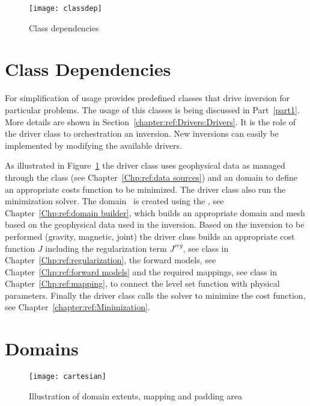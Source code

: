 \begin{figure}[ht]
    \centering\texttt{[image: classdep]}
    \caption{Class dependencies}
    \label{fig:classes}
\end{figure} 

\section{Class Dependencies}
For simplification of usage \downunder provides predefined classes that drive inversion for particular 
problems. The usage of this classes is being discussed in Part~\ref{part1}. More details are shown in
Section~\ref{chapter:ref:Drivers:Drivers}. It is the role of the driver class to orchestration an 
inversion. New inversions can easily be implemented by modifying the available drivers.

As illustrated in Figure~\ref{fig:classes} the driver class uses geophysical data as
managed through the  class (see Chapter~\ref{Chp:ref:data sources}) and 
an \escript domain to define an appropriate
costs function to be minimized. The driver class also run the minimization solver.
The \escript domain~\cite{ESCRIPT} is created using the , see Chapter~\ref{Chp:ref:domain builder},
which builds an appropriate domain and mesh based on the geophysical data used in the inversion. 
Based on the inversion to be performed (gravity, magnetic, joint) the 
driver class builds an appropriate cost function $J$ including the regularization term $J^{reg}$, see
 class in Chapter~\ref{Chp:ref:regularization}, 
the forward models, see Chapter~\ref{Chp:ref:forward models} and
the required mappings, see  class in Chapter~\ref{Chp:ref:mapping},
to connect the level set function with physical parameters. Finally the driver class calls the
solver to minimize the cost function, see Chapter~\ref{chapter:ref:Minimization}.


\section{Domains}


\begin{figure}[ht]
    \centering\texttt{[image: cartesian]}
    \caption{Illustration of domain extents, mapping and padding area}
    \label{fig:cartesianDomain}
\end{figure}

